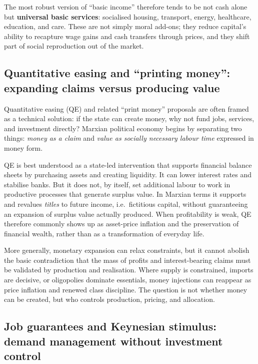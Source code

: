 The most robust version of ``basic income'' therefore tends to be not cash alone but \textbf{universal basic services}:
socialised housing, transport, energy, healthcare, education, and care. These are not simply moral add-ons; they reduce
capital's ability to recapture wage gains and cash transfers through prices, and they shift part of social reproduction
out of the market.

\subsection{Quantitative easing and ``printing money'': expanding claims versus producing value}
\label{sec:policy-qe}

Quantitative easing (QE) and related ``print money'' proposals are often framed as a technical solution: if the state can
create money, why not fund jobs, services, and investment directly? Marxian political economy begins by separating two
things: \emph{money as a claim} and \emph{value as socially necessary labour time} expressed in money form.

QE is best understood as a state-led intervention that supports financial balance sheets by purchasing assets and
creating liquidity. It can lower interest rates and stabilise banks. But it does not, by itself, set additional labour
to work in productive processes that generate surplus value. In Marxian terms it supports and revalues \emph{titles} to
future income, i.e.\ fictitious capital, without guaranteeing an expansion of surplus value actually produced. When
profitability is weak, QE therefore commonly shows up as asset-price inflation and the preservation of financial wealth,
rather than as a transformation of everyday life.

More generally, monetary expansion can relax constraints, but it cannot abolish the basic contradiction that the mass of
profits and interest-bearing claims must be validated by production and realisation. Where supply is constrained, imports
are decisive, or oligopolies dominate essentials, money injections can reappear as price inflation and renewed class
discipline. The question is not whether money can be created, but who controls production, pricing, and allocation.

\subsection{Job guarantees and Keynesian stimulus: demand management without investment control}
\label{sec:policy-job-guarantee}

